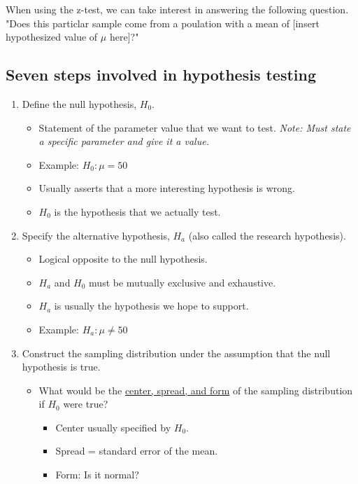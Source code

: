 \documentclass[11pt]{report}
\begin{document}
When using the z-test, we can take interest in answering the following question. "Does this particlar sample come from a poulation with a mean of [insert hypothesized value of $\mu$ here]?" \newline

\subsection{Seven steps involved in hypothesis testing}

\begin{enumerate}
    \item Define the null hypothesis, $H_0$.
    \begin{itemize}
        \item Statement of the parameter value that we want to test. \textit{Note: Must state a specific parameter and give it a value.}
        \item Example: $H_0: \mu = 50$
        \item Usually asserts that a more interesting hypothesis is wrong. 
        \item $H_0$ is the hypothesis that we actually test. 
    \end{itemize}
    \item Specify the alternative hypothesis, $H_a$ (also called the research hypothesis).
    \begin{itemize}
        \item Logical opposite to the null hypothesis.
        \item $H_a$ and $H_0$ must be mutually exclusive and exhaustive.
        \item $H_a$ is usually the hypothesis we hope to support. 
        \item Example: $H_a: \mu \neq 50$
    \end{itemize}
    \item Construct the sampling distribution under the assumption that the null hypothesis is true.
    \begin{itemize}
        \item What would be the \underline{center, spread, and form} of the sampling distribution if $H_0$ were true?
        \begin{itemize}
            \item Center usually specified by $H_0$.
            \item Spread = standard error of the mean. 
            \item Form: Is it normal? 

\end{itemize}
\end{itemize}
\end{enumerate}
\end{document}
